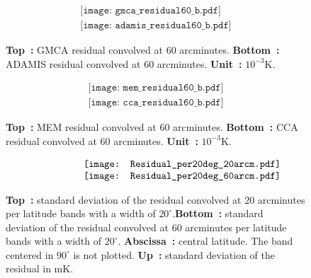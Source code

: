\begin{center}
\begin{figure}[htb]
$$
\begin{array}{cc}
\texttt{[image: gmca\_residual60\_b.pdf]} \\
\texttt{[image: adamis\_residual60\_b.pdf]} 
\end{array}
$$
\vspace{-0.1in} \caption{\textbf{Top~:} GMCA residual convolved at $60$ arcminutes. \textbf{Bottom~:} ADAMIS residual convolved at $60$ arcminutes. \textbf{Unit~:}  $10^{-3}$K.} \label{fig:wg2_resi60}
\end{figure}
\end{center}

\begin{center}
\begin{figure}[htb]
$$
\begin{array}{cc}
\texttt{[image: mem\_residual60\_b.pdf]} \\
\texttt{[image: cca\_residual60\_b.pdf]}
\end{array}
$$
\vspace{-0.1in} \caption{\textbf{Top~:} MEM residual convolved at $60$ arcminutes. \textbf{Bottom~:} CCA residual convolved at $60$ arcminutes. \textbf{Unit~:}  $10^{-3}$K.} \label{fig:wg2_resi60_2}
\end{figure}
\end{center}

\begin{figure}[htb]
\hspace{0.1in}
$$
\begin{array}{c}
    \centerline{\texttt{[image: Residual\_per20deg\_20arcm.pdf]}} \\
    \centerline{\texttt{[image: Residual\_per20deg\_60arcm.pdf]}}
\end{array}
$$
\vspace{-0.1in} 
\caption{\textbf{Top~:} standard deviation of the residual convolved at $20$ arcminutes per latitude bands with a width of $20^\circ$.\textbf{Bottom~:} standard deviation of the residual convolved at $60$ arcminutes per latitude bands with a width of $20^\circ$. \textbf{Abscissa~:} central latitude. The band centered in $90^\circ$ is not plotted. \textbf{Up~:} standard deviation of the residual in mK.}  \label{fig:wg2_resiperlat}
\end{figure}

